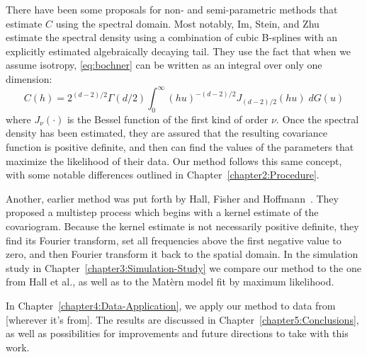 There have been some proposals for non- and semi-parametric methods that estimate $C$ using the spectral domain. Most notably, Im, Stein, and Zhu~\cite{IM2007} estimate the spectral density using a combination of cubic B-splines with an explicitly estimated algebraically decaying tail. They use the fact that when we assume isotropy, \eqref{eq:bochner} can be written as an integral over only one dimension:
\[
	C(h) = 2^{(d-2)/2}\Gamma(d/2) \int_0^\infty (hu)^{-(d-2)/2} J_{(d-2)/2}(hu) \; dG(u)
\]
where $J_\nu(\cdot)$ is the Bessel function of the first kind of order $\nu$. Once the spectral density has been estimated, they are assured that the resulting covariance function is positive definite, and then can find the values of the parameters that maximize the likelihood of their data. Our method follows this same concept, with some notable differences outlined in Chapter~\ref{chapter2:Procedure}.

Another, earlier method was put forth by Hall, Fisher and Hoffmann~\cite{Hall1994}. They proposed a multistep process which begins with a kernel estimate of the covariogram. Because the kernel estimate is not necessarily positive definite, they find its Fourier transform, set all frequencies above the first negative value to zero, and then Fourier transform it back to the spatial domain. In the simulation study in Chapter~\ref{chapter3:Simulation-Study} we compare our method to the one from Hall et al., as well as to the Mat\`ern model fit by maximum likelihood.

In Chapter~\ref{chapter4:Data-Application}, we apply our method to data from [wherever it's from]. The results are discussed in Chapter~\ref{chapter5:Conclusions}, as well as possibilities for improvements and future directions to take with this work.

